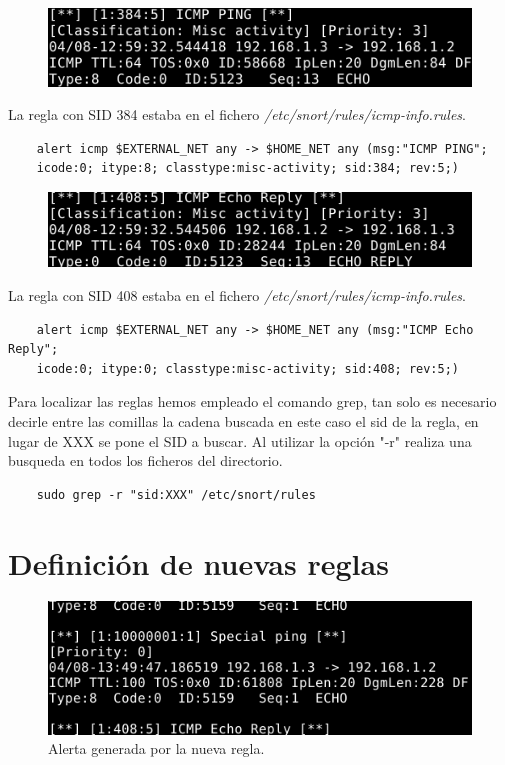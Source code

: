 \documentclass[11pt]{article}
\begin{document}
    \begin{figure}[H]
      \centering
      \includegraphics[width = \textwidth]{nbra1}
    \end{figure}
    \par
    La regla con SID 384 estaba en el fichero
    \textit{/etc/snort/rules/icmp-info.rules}.
    \begin{lstlisting}
    alert icmp $EXTERNAL_NET any -> $HOME_NET any (msg:"ICMP PING";
    icode:0; itype:8; classtype:misc-activity; sid:384; rev:5;)
    \end{lstlisting}

    \begin{figure}[H]
      \centering
      \includegraphics[width = \textwidth]{nbra2}
    \end{figure}
    \par
    La regla con SID 408 estaba en el fichero
    \textit{/etc/snort/rules/icmp-info.rules}.
    \begin{lstlisting}
    alert icmp $EXTERNAL_NET any -> $HOME_NET any (msg:"ICMP Echo Reply";
    icode:0; itype:0; classtype:misc-activity; sid:408; rev:5;)
    \end{lstlisting}

    \bigskip
    \par
    Para localizar las reglas hemos empleado el comando grep, tan solo es
    necesario decirle entre las comillas la cadena buscada en este caso el sid
    de la regla, en lugar de XXX se pone el SID a buscar. Al utilizar la opción
    "-r" realiza una busqueda en todos los ficheros del directorio.
    \begin{lstlisting}
    sudo grep -r "sid:XXX" /etc/snort/rules
    \end{lstlisting}

  \section{Definición de nuevas reglas}
    \begin{figure}[H]
      \centering
      \includegraphics[width = \textwidth]{nra}
      \caption{Alerta generada por la nueva regla.}
    \end{figure}
\end{document}
